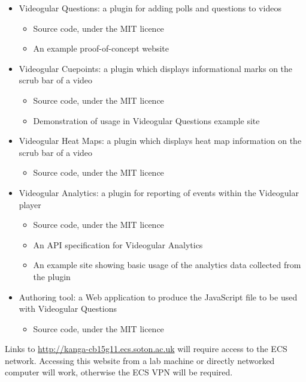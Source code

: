 \documentclass[12pt,a4paper]{article}
\begin{document}
\begin{itemize}
\item Videogular Questions: a plugin for adding polls and questions to videos
	\begin{itemize}
	\item Source code, under the MIT licence
	\item An example proof-of-concept website
	\end{itemize}
	
\item Videogular Cuepoints: a plugin which displays informational marks on the scrub bar of a video
	\begin{itemize}
	\item Source code, under the MIT licence
	\item Demonstration of usage in Videogular Questions example site
	\end{itemize}
	
\item Videogular Heat Maps: a plugin which displays heat map information on the scrub bar of a video
	\begin{itemize}
	\item Source code, under the MIT licence
	\end{itemize}
	
\item Videogular Analytics: a plugin for reporting of events within the Videogular player
	\begin{itemize}
	\item Source code, under the MIT licence
	\item An API specification for Videogular Analytics
	\item An example site showing basic usage of the analytics data collected from the plugin
	\end{itemize}
	
\item Authoring tool: a Web application to produce the JavaScript file to be used with Videogular Questions
	\begin{itemize}
	\item Source code, under the MIT licence
	\end{itemize}
\end{itemize}

Links to \url{http://kanga-cb15g11.ecs.soton.ac.uk} will require access to the ECS network. Accessing this website from a lab machine or directly networked computer will work, otherwise the ECS VPN will be required.
\end{document}
